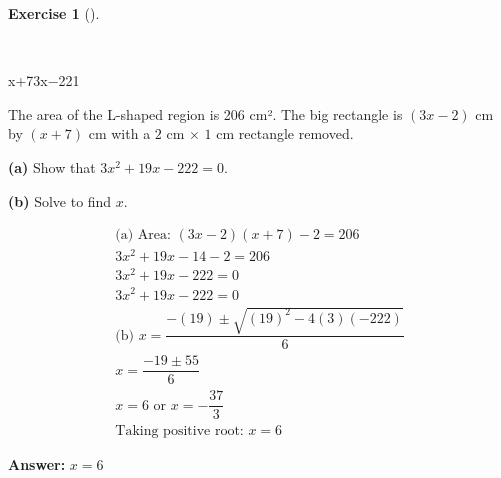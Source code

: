 \documentclass[
  letterpaper,
  DIV=11,
  numbers=noendperiod]{scrreprt}
\theoremstyle{definition}
\newtheorem{exercise}{Exercise}[chapter]
\theoremstyle{remark}
\begin{document}
\begin{exercise}[]\protect\hypertarget{exr-u6-30-2}{}\label{exr-u6-30-2}

~

x+73x−221

The area of the L-shaped region is 206 cm². The big rectangle is
\((3x-2)\) cm by \((x+7)\) cm with a \(2\) cm \(\times\) \(1\) cm
rectangle removed.

\textbf{(a)} Show that \(3x^2 + 19x - 222 = 0\).

\textbf{(b)} Solve to find \(x\).

\begin{tcolorbox}[enhanced jigsaw, opacitybacktitle=0.6, coltitle=black, arc=.35mm, colframe=quarto-callout-tip-color-frame, colback=white, bottomrule=.15mm, left=2mm, colbacktitle=quarto-callout-tip-color!10!white, titlerule=0mm, opacityback=0, title=\textcolor{quarto-callout-tip-color}{\faLightbulb}\hspace{0.5em}{🔍 View Solution}, leftrule=.75mm, breakable, rightrule=.15mm, bottomtitle=1mm, toptitle=1mm, toprule=.15mm]

\begin{align*}
\text{(a) Area: } (3x-2)(x+7) - 2 = 206 \\ 3x^2 +19x - 14 - 2 = 206 \\ 3x^2 +19x - 222 = 0 \\ 3x^2 + 19x - 222 = 0 \\ \text{(b) } x = \dfrac{-(19) \pm \sqrt{(19)^2 - 4(3)(-222)}}{6} \\ x = \dfrac{-19 \pm 55}{6} \\ x = 6 \text{ or } x = -\dfrac{37}{3} \\ \text{Taking positive root: } x = 6
\end{align*}

\textbf{Answer:} \(x = 6\)

\end{tcolorbox}

\end{exercise}
\end{document}
